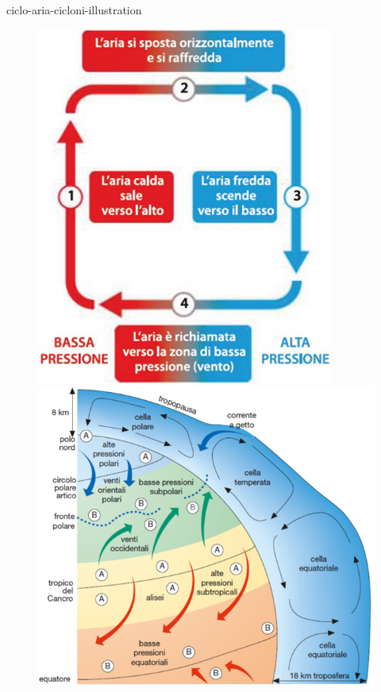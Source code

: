 \documentclass[preview]{standalone}
\begin{document}
\begin{snippet}{ciclo-aria-cicloni-illustration}
    \begin{figure}[h]
        \centering
        \begin{minipage}{0.37\textwidth}
            \centering
            \includegraphics[width=\linewidth]{resources/ciclo-aria.png}
        \end{minipage}\hfill
        \begin{minipage}{0.60\textwidth}
            \centering
            \includegraphics[width=\linewidth]{resources/cicloni.png}
        \end{minipage}
    \end{figure}
    \vspace{0.25cm}
\end{snippet}
\end{document}
